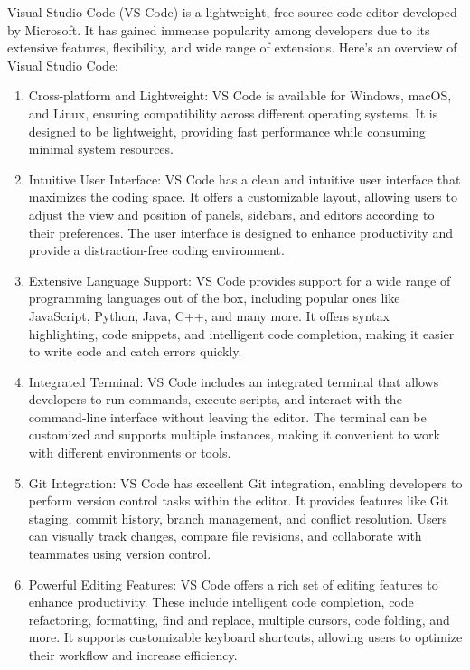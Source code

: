 \documentclass[12 pt, oneside]{book}
\begin{document}
Visual Studio Code (VS Code) is a lightweight, free source code editor developed by Microsoft. It has gained immense popularity among developers due to its extensive features, flexibility, and wide range of extensions. Here's an overview of Visual Studio Code:
\begin{enumerate}
\item Cross-platform and Lightweight: VS Code is available for Windows, macOS, and Linux, ensuring compatibility across different operating systems. It is designed to be lightweight, providing fast performance while consuming minimal system resources.

\item Intuitive User Interface: VS Code has a clean and intuitive user interface that maximizes the coding space. It offers a customizable layout, allowing users to adjust the view and position of panels, sidebars, and editors according to their preferences. The user interface is designed to enhance productivity and provide a distraction-free coding environment.

\item Extensive Language Support: VS Code provides support for a wide range of programming languages out of the box, including popular ones like JavaScript, Python, Java, C++, and many more. It offers syntax highlighting, code snippets, and intelligent code completion, making it easier to write code and catch errors quickly.

\item Integrated Terminal: VS Code includes an integrated terminal that allows developers to run commands, execute scripts, and interact with the command-line interface without leaving the editor. The terminal can be customized and supports multiple instances, making it convenient to work with different environments or tools.

\item Git Integration: VS Code has excellent Git integration, enabling developers to perform version control tasks within the editor. It provides features like Git staging, commit history, branch management, and conflict resolution. Users can visually track changes, compare file revisions, and collaborate with teammates using version control.

\item Powerful Editing Features: VS Code offers a rich set of editing features to enhance productivity. These include intelligent code completion, code refactoring, formatting, find and replace, multiple cursors, code folding, and more. It supports customizable keyboard shortcuts, allowing users to optimize their workflow and increase efficiency.


\end{enumerate}
\end{document}
